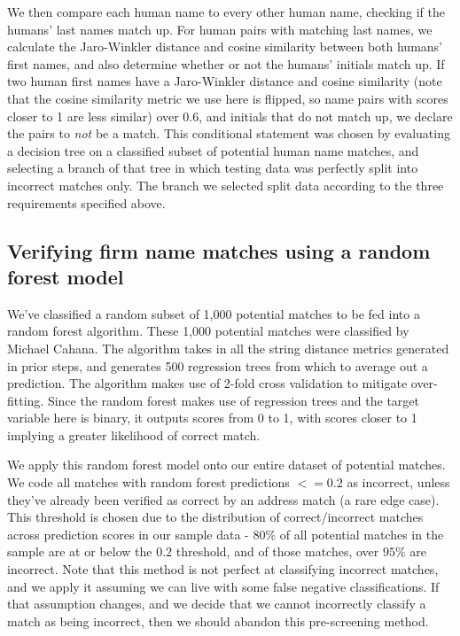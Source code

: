 \documentclass{article}
\begin{document}
We then compare each human name to every other human name, checking if the humans' last names match up. For human pairs with matching last names, we calculate the Jaro-Winkler distance and cosine similarity between both humans' first names, and also determine whether or not the humans' initials match up. If two human first names have a Jaro-Winkler distance and cosine similarity (note that the cosine similarity metric we use here is flipped, so name pairs with scores closer to 1 are less similar) over $0.6$, and initials that do not match up, we declare the pairs to \textit{not} be a match. This conditional statement was chosen by evaluating a decision tree on a classified subset of potential human name matches, and selecting a branch of that tree in which testing data was perfectly split into incorrect matches only. The branch we selected split data according to the three requirements specified above. 

\subsection{Verifying firm name matches using a random forest model}

We've classified a random subset of 1,000 potential matches to be fed into a random forest algorithm. These 1,000 potential matches were classified by Michael Cahana. The algorithm takes in all the string distance metrics generated in prior steps, and generates 500 regression trees from which to average out a prediction. The algorithm makes use of 2-fold cross validation to mitigate over-fitting. Since the random forest makes use of regression trees and the target variable here is binary, it outputs scores from 0 to 1, with scores closer to 1 implying a greater likelihood of correct match. 

We apply this random forest model onto our entire dataset of potential matches. We code all matches with random forest predictions $<= 0.2$ as incorrect, unless they've already been verified as correct by an address match (a rare edge case). This threshold is chosen due to the distribution of correct/incorrect matches across prediction scores in our sample data - $80\%$ of all potential matches in the sample are at or below the $0.2$ threshold, and of those matches, over $95\%$ are incorrect. Note that this method is not perfect at classifying incorrect matches, and we apply it assuming we can live with some false negative classifications. If that assumption changes, and we decide that we cannot incorrectly classify a match as being incorrect, then we should abandon this pre-screening method. 
\end{document}
